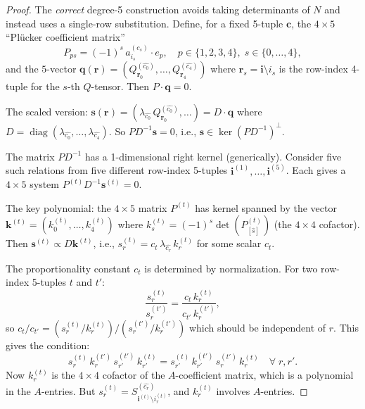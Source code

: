 \begin{proof}
\medskip
The \emph{correct} degree-5 construction avoids taking determinants of $N$
and instead uses a single-row substitution. Define, for a fixed 5-tuple
$\mathbf{c}$, the $4\times 5$ ``Pl\"ucker coefficient matrix''
\begin{equation}\label{eq:p9-Pmat}
  P_{ps} = (-1)^s\,a^{(c_s)}_{i_s}\cdot e_p, \quad p\in\{1,2,3,4\},\;s\in\{0,\ldots,4\},
\end{equation}
and the $5$-vector $\mathbf{q}(\mathbf{r}) = (Q^{(\widehat{c_0})}_{\mathbf{r}_0},\ldots,
Q^{(\widehat{c_4})}_{\mathbf{r}_4})$ where $\mathbf{r}_s = \mathbf{i}\setminus i_s$
is the row-index 4-tuple for the $s$-th $Q$-tensor. Then $P\cdot\mathbf{q} = 0$.

The scaled version: $\mathbf{s}(\mathbf{r}) = (\lambda_{\widehat{c_0}}\,Q^{(\widehat{c_0})}_{\mathbf{r}_0},
\ldots) = D\cdot\mathbf{q}$ where $D = \operatorname{diag}(\lambda_{\widehat{c_0}},\ldots,\lambda_{\widehat{c_4}})$.
So $P D^{-1}\mathbf{s} = 0$, i.e., $\mathbf{s}\in\ker(PD^{-1})^{\perp}$.

The matrix $PD^{-1}$ has a 1-dimensional right kernel (generically).
Consider five such relations from five different row-index 5-tuples
$\mathbf{i}^{(1)},\ldots,\mathbf{i}^{(5)}$. Each gives a $4\times 5$
system $P^{(t)}D^{-1}\mathbf{s}^{(t)} = 0$.

The key polynomial: the $4\times 5$ matrix $P^{(t)}$ has kernel spanned by
the vector $\mathbf{k}^{(t)} = (k^{(t)}_0,\ldots,k^{(t)}_4)$ where
$k^{(t)}_s = (-1)^s\det(P^{(t)}_{[\widehat{s}]})$ (the $4\times 4$ cofactor).
Then $\mathbf{s}^{(t)} \propto D\mathbf{k}^{(t)}$, i.e.,
$s^{(t)}_r = c_t\,\lambda_{\widehat{c_r}}\,k^{(t)}_r$ for some scalar $c_t$.

The proportionality constant $c_t$ is determined by normalization.
For two row-index 5-tuples $t$ and $t'$:
\begin{equation}\label{eq:p9-ratio-st}
  \frac{s^{(t)}_r}{s^{(t')}_r} = \frac{c_t\,k^{(t)}_r}{c_{t'}\,k^{(t')}_r},
\end{equation}
so $c_t/c_{t'} = (s^{(t)}_r / k^{(t)}_r)/(s^{(t')}_r / k^{(t')}_r)$
which should be independent of $r$. This gives the condition:
\[
  s^{(t)}_r\,k^{(t')}_r\,s^{(t')}_{r'}\,k^{(t)}_{r'}
  = s^{(t)}_{r'}\,k^{(t')}_{r'}\,s^{(t')}_r\,k^{(t)}_r
  \quad\forall\;r,r'.
\]
Now $k^{(t)}_r$ is the $4\times 4$ cofactor of the $A$-coefficient matrix, which
is a polynomial in the $A$-entries. But $s^{(t)}_r = S^{(\widehat{c_r})}_{\mathbf{i}^{(t)}\setminus i^{(t)}_r}$,
and $k^{(t)}_r$ involves $A$-entries.


\end{proof}
